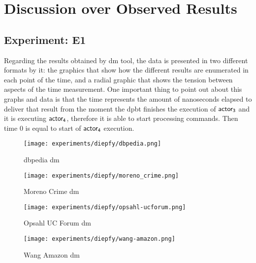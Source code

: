 \section{\textbf{Discussion over Observed Results}}\label{sec:discussion}
\subsection{Experiment: E1}\label{sub:sec:res:e1}
Regarding the results obtained by \acrshort{dm} tool, the data is presented in two different formats by it: the graphics that show 
how the different results are enumerated in each point of the time, and a radial graphic that shows the tension between aspects of the time measurement.
One important thing to point out about this graphs and data is that the time represents the amount of nanoseconds elapsed to deliver that result from the moment 
the \acrshort{dpbt} finishes the execution of $\mathsf{actor_3}$ and it is executing $\mathsf{actor_4}$, therefore it is able to start processing commands. Then time $0$ is equal to start 
of $\mathsf{actor_4}$ execution.

\begin{figure}[!htb]
  \centering
  \begin{minipage}{0.5\textwidth}
   \texttt{[image: experiments/diepfy/dbpedia.png]}
    \caption{\acrshort{dbpedia} \acrshort{dm}}
    \label{fig:dief:dbpedia}
  \end{minipage}%
  \begin{minipage}{0.5\textwidth}
   \texttt{[image: experiments/diepfy/moreno\_crime.png]}
    \caption{Moreno Crime \acrshort{dm}}
    \label{fig:dief:moreno}
  \end{minipage}
\end{figure}
%
\begin{figure}[!htb]
  \centering
  \begin{minipage}{0.5\textwidth}
   \texttt{[image: experiments/diepfy/opsahl-ucforum.png]}
    \caption{Opsahl UC Forum \acrshort{dm}}
    \label{fig:dief:opsahl}
  \end{minipage}%
  \begin{minipage}{0.5\textwidth}
    \texttt{[image: experiments/diepfy/wang-amazon.png]}
     \caption{Wang Amazon \acrshort{dm}}
     \label{fig:dief:wang}
   \end{minipage}
 \end{figure}

